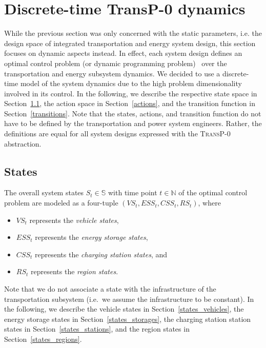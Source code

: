 \section{Discrete-time \textbf{TransP-0} dynamics}
\label{dynamics}

While the previous section was only concerned with the static parameters, i.e. the design space of integrated transportation and energy system design, this section focuses on dynamic aspects instead. In effect, each system design defines an optimal control problem (or dynamic programming problem)~\cite{Bertsekas1995} over the transportation and energy subsystem dynamics. We decided to use a discrete-time model of the system dynamics due to the high problem dimensionality involved in its control. In the following, we describe the respective state space in Section~\ref{states}, the action space in Section~\ref{actions}, and the transition function in Section~\ref{transitions}. Note that the states, actions, and transition function do not have to be defined by the transportation and power system engineers. Rather, the definitions are equal for all system designs expressed with the \textsc{TransP-0} abstraction.

\subsection{States}
\label{states}

The overall system states $S_t \in \mathbb{S}$ with time point $t \in \mathbb{N}$ of the optimal control problem are modeled as a four-tuple $(VS_t, ESS_t, CSS_t, RS_t)$, where
\begin{itemize}
	\item $VS_t$ represents the \textit{vehicle  states},
	\item $ESS_t$ represents the \textit{energy storage states},
	\item $CSS_t$ represents the \textit{charging station states}, and
	\item $RS_t$ represents the \textit{region states}.
\end{itemize}
Note that we do not associate a state with the infrastructure of the transportation subsystem (i.e.\ we assume the infrastructure to be constant). In the following, we describe the vehicle states in Section~\ref{states_vehicles}, the energy storage states in Section~\ref{states_storages}, the charging station station states in Section~\ref{states_stations}, and the region states in Section~\ref{states_regions}.

